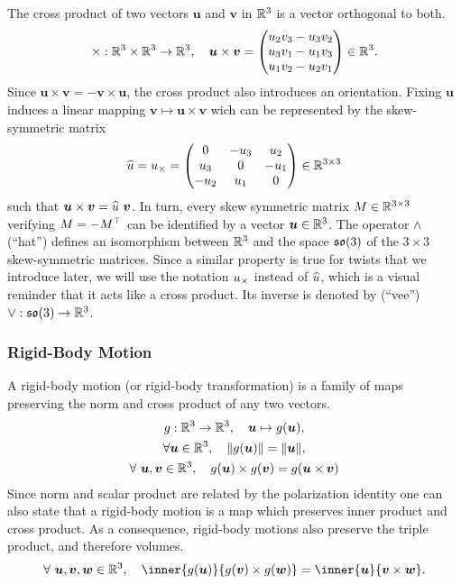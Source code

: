 The cross product of two vectors $\bm{u}$ and $\bm{v}$ in $\R^3$ is a vector orthogonal to both.
\[
	\times : \R^3 \times \R^3 \rightarrow \R^3,\quad \bm{u} \times \bm{v} =
	\begin{pmatrix}
		u_2v_3 - u_3v_2 \\
		u_3v_1 - u_1v_3 \\
		u_1v_2 - u_2v_1
	\end{pmatrix} \in \R^3.
\]
Since $\bm{u} \times \bm{v} = -\bm{v} \times \bm{u}$, the cross product
also introduces an orientation.
Fixing $\bm{u}$ induces a linear mapping $\bm{v} \mapsto \bm{u} \times \bm{v}$
wich can be represented by the skew-symmetric matrix
\[
	\twist{u} = \cross{u} = \hatmat{u_1}{u_2}{u_3} \in \RR{3}{3}
\]
such that $\bm{u} \times \bm{v} = \twist{u} \ \bm{v}$.
In turn, every skew symmetric matrix $M \in \RR{3}{3}$
verifying $M = -\tr{M}$
can be identified by a vector $\bm{u} \in \R^3$.
The operator $\wedge$ (``hat'') defines an isomorphism between $\R^3$
and the space $\sooo$ of the $3 \times 3$ skew-symmetric matrices.
Since a similar property is true for twists that we introduce later,
we will use the notation $\cross{u}$ instead of $\twist{u}$,
which is a visual reminder that it acts like a cross product.
Its inverse is denoted by (``vee'') $\vee : \sooo \rightarrow \R^3$.


\subsubsection{Rigid-Body Motion}%
\label{ssub:rigid_body_motion}

A rigid-body motion (or rigid-body transformation)
is a family of maps preserving the norm and cross product of any two vectors.
\begin{gather*}
	g : \R^3 \rightarrow \R^3,\quad \bm{u} \mapsto g(\bm{u}), \\
	\forall \bm{u} \in \R^3, \quad \|g(\bm{u})\| = \|\bm{u}\|, \\
	\forall\ \bm{u},\bm{v} \in \R^3, \quad g(\bm{u}) \times g(\bm{v}) =
		g(\bm{u} \times \bm{v})
\end{gather*}
Since norm and scalar product are related by the polarization identity
one can also state that a rigid-body motion is a map which
preserves inner product and cross product.
As a consequence, rigid-body motions also preserve the triple product,
and therefore volumes.
\[
	\forall\ \bm{u}, \bm{v}, \bm{w} \in \R^3, \quad
	\inner{g(\bm{u})}{g(\bm{v}) \times g(\bm{w})} =
		\inner{\bm{u}}{\bm{v} \times \bm{w}}.
\]

